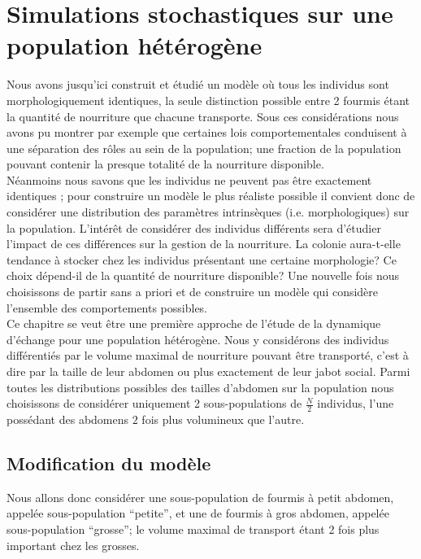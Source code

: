 
\chapter{Simulations stochastiques sur une population hétérogène}

Nous avons jusqu'ici construit et étudié un modèle où tous les individus sont morphologiquement identiques, la seule distinction possible entre 2 fourmis étant la quantité de nourriture que chacune transporte. Sous ces considérations nous avons pu montrer par exemple que certaines lois comportementales conduisent à une séparation des rôles au sein de la population; une fraction de la population pouvant contenir la presque totalité de la  nourriture disponible.\\

Néanmoins nous savons que les individus ne peuvent pas être exactement identiques \citep{passera_les_2005}; pour construire un modèle le plus réaliste possible il convient donc de considérer une distribution des paramètres intrinsèques (i.e. morphologiques) sur la population. L'intérêt de considérer des individus différents sera d'étudier l'impact de ces différences sur la gestion de la nourriture. La colonie aura-t-elle tendance à stocker chez les individus présentant une certaine morphologie? Ce choix dépend-il de la quantité de nourriture disponible? Une nouvelle fois nous choisissons de partir sans a priori et de construire un modèle qui considère l'ensemble des comportements possibles.\\

Ce chapitre se veut être une première approche de l'étude de la dynamique d'échange pour une population hétérogène. Nous y considérons des individus différentiés par le volume maximal de nourriture pouvant être transporté, c'est à dire par la taille de leur abdomen ou plus exactement de leur jabot social. Parmi toutes les distributions possibles des tailles d'abdomen sur la population nous choisissons de considérer uniquement   2 sous-populations de $\frac{N}{2}$ individus, l'une possédant des abdomens $2$ fois plus volumineux que l'autre.

\section{Modification du modèle}

Nous allons donc considérer une sous-population de fourmis à petit abdomen, appelée sous-population ``petite'', et une de fourmis à gros abdomen, appelée sous-population ``grosse''; le volume maximal de transport étant 2 fois plus important chez les grosses. \\

